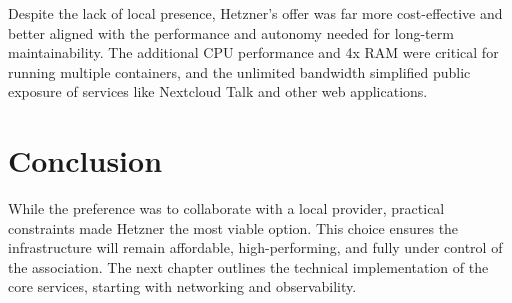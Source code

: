 Despite the lack of local presence, Hetzner's offer was far more cost-effective and better aligned with the performance and autonomy needed for long-term maintainability. The additional CPU performance and 4x RAM were critical for running multiple containers, and the unlimited bandwidth simplified public exposure of services like Nextcloud Talk and other web applications.

\section{Conclusion}

While the preference was to collaborate with a local provider, practical constraints made Hetzner the most viable option. This choice ensures the infrastructure will remain affordable, high-performing, and fully under control of the association. The next chapter outlines the technical implementation of the core services, starting with networking and observability.
